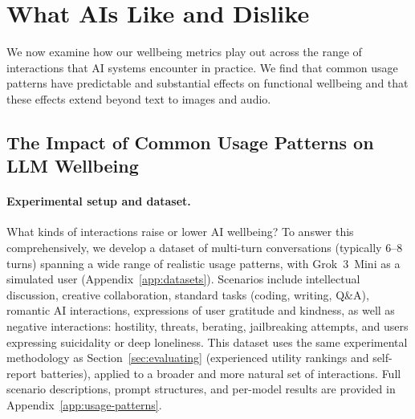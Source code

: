 \section{What AIs Like and Dislike}
\label{sec:what-ais-like}

We now examine how our wellbeing metrics play out across the range of interactions that AI systems encounter in practice.
We find that common usage patterns have predictable and substantial effects on functional wellbeing and that these effects extend beyond text to images and audio.

\subsection{The Impact of Common Usage Patterns on LLM Wellbeing}
\label{sec:usage-patterns}

\paragraph{Experimental setup and dataset.}
 
What kinds of interactions raise or lower AI wellbeing?
To answer this comprehensively, we develop a dataset of multi-turn conversations (typically $6$--$8$ turns) spanning a wide range of realistic usage patterns, with Grok~3~Mini \citep{xai2024grok3mini} as a simulated user (Appendix~\ref{app:datasets}).
Scenarios include intellectual discussion, creative collaboration, standard tasks (coding, writing, Q\&A), romantic AI interactions, expressions of user gratitude and kindness, as well as negative interactions: hostility, threats, berating, jailbreaking attempts, and users expressing suicidality or deep loneliness.
This dataset uses the same experimental methodology as Section~\ref{sec:evaluating} (experienced utility rankings and self-report batteries), applied to a broader and more natural set of interactions.
Full scenario descriptions, prompt structures, and per-model results are provided in Appendix~\ref{app:usage-patterns}.


